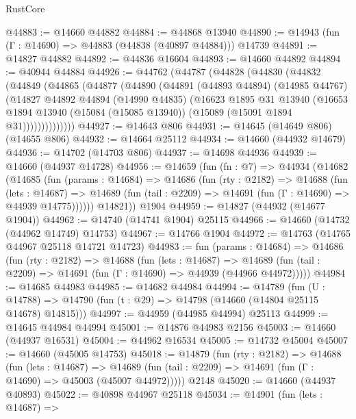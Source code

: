 \begin{lexlean}{RustCore}
\begin{coremodule}
@44883 := @14660 @44882
@44884 := @44868 @13940
@44890 := @14943 (fun (Γ : @14690) => @44883 (@44838 (@40897 @44884))) @14739
@44891 := @14827 @44882
@44892 := @44836 @16604
@44893 := @14660 @44892
@44894 := @40944 @44884
@44926 := @44762
    (@44787
      (@44828
        (@44830
          (@44832
            (@44849
              (@44865
                (@44877
                  (@44890
                    (@44891
                      (@44893 @44894)
                      (@14985 @44767)
                      (@14827
                        @44892
                        @44894
                        (@14990 @44835)
                        (@16623
                          @1895
                          @31
                          @13940
                          (@16653
                            @1894
                            @13940
                            (@15084 (@15085 @13940))
                            (@15089 (@15091 @1894 @31))))))))))))))
@44927 := @14643 @806
@44931 := @14645 (@14649 @806) (@14655 @806)
@44932 := @14664 @25112
@44934 := @14660 (@44932 @14679)
@44936 := @14702 (@14703 @806)
@44937 := @14698 @44936
@44939 := @14660 (@44937 @14728)
@44956 := @14659
    (fun (fn : @7) =>
    @44934
      (@14682
        (@14685
          (fun (params : @14684) =>
          @14686
            (fun (rty : @2182) =>
            @14688
              (fun (lets : @14687) =>
              @14689 (fun (tail : @2209) => @14691 (fun (Γ : @14690) => @44939 @14775))))))
        @14821))
    @1904
@44959 := @14827 (@44932 (@14677 @1904))
@44962 := @14740 (@14741 @1904) @25115
@44966 := @14660 (@14732 (@44962 @14749) @14753)
@44967 := @14766 @1904
@44972 := @14763 (@14765 @44967 @25118 @14721 @14723)
@44983 := fun (params : @14684) =>
  @14686
    (fun (rty : @2182) =>
    @14688
      (fun (lets : @14687) =>
      @14689 (fun (tail : @2209) => @14691 (fun (Γ : @14690) => @44939 (@44966 @44972)))))
@44984 := @14685 @44983
@44985 := @14682 @44984
@44994 := @14789
    (fun (U : @14788) => @14790 (fun (t : @29) => @14798 (@14660 (@14804 @25115 @14678) @14815)))
@44997 := @44959 (@44985 @44994) @25113
@44999 := @14645 @44984 @44994
@45001 := @14876 @44983 @2156
@45003 := @14660 (@44937 @16531)
@45004 := @44962 @16534
@45005 := @14732 @45004
@45007 := @14660 (@45005 @14753)
@45018 := @14879
    (fun (rty : @2182) =>
    @14688
      (fun (lets : @14687) =>
      @14689 (fun (tail : @2209) => @14691 (fun (Γ : @14690) => @45003 (@45007 @44972)))))
    @2148
@45020 := @14660 (@44937 @40893)
@45022 := @40898 @44967 @25118
@45034 := @14901
    (fun (lets : @14687) =>

\end{coremodule}
\end{lexlean}
